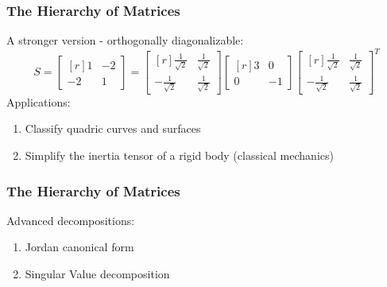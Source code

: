 \documentclass[10pt]{beamer}
\begin{document}
\begin{frame}
\frametitle{The Hierarchy of Matrices}
A stronger version - orthogonally diagonalizable:
\[
S = \begin{bmatrix*}[r]
1&-2\\[1em]
-2&1
\end{bmatrix*} = \begin{bmatrix*}[r]
\frac{1}{\sqrt 2}&\frac{1}{\sqrt 2}\\[1em]
-\frac{1}{\sqrt 2}&\frac{1}{\sqrt 2}
\end{bmatrix*}\begin{bmatrix*}[r]
3&0\\[1em]
0&-1
\end{bmatrix*}\begin{bmatrix*}[r]
\frac{1}{\sqrt 2}&\frac{1}{\sqrt 2}\\[1em]
-\frac{1}{\sqrt 2}&\frac{1}{\sqrt 2}
\end{bmatrix*}^T
\]
\pause
Applications:
\begin{enumerate}[label = {(\alph*)}]
\item Classify quadric curves and surfaces\pause
\item Simplify the inertia tensor of a rigid body (classical mechanics)
\end{enumerate}
\end{frame}
\begin{frame}
\frametitle{The Hierarchy of Matrices}
Advanced decompositions:
\begin{enumerate}[label=\bullet]
\item
Jordan canonical form
\item
Singular Value decomposition
\end{enumerate}
\end{frame}
\end{document}
